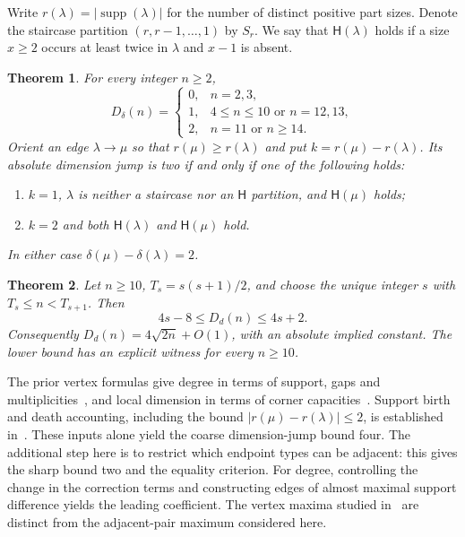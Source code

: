 \documentclass[11pt]{article}
\newtheorem{theorem}{Theorem}
\newcommand{\supp}{\operatorname{supp}}
\newcommand{\HH}{\mathsf{H}}
\begin{document}
Write $r(\lambda)=|\supp(\lambda)|$ for the number of distinct positive
part sizes. Denote the staircase partition $(r,r-1,\ldots,1)$ by $S_r$.
We say that $\HH(\lambda)$ holds if a size $x\geq2$ occurs at least twice
in $\lambda$ and $x-1$ is absent.

\begin{theorem}\label{thm:dimension}
For every integer $n\geq2$,
\begin{equation}\label{eq:exact-dimension}
 D_\delta(n)=
 \begin{cases}
 0,& n=2,3,\\
 1,& 4\leq n\leq10\text{ or }n=12,13,\\
 2,& n=11\text{ or }n\geq14.
 \end{cases}
\end{equation}
Orient an edge $\lambda\to\mu$ so that $r(\mu)\geq r(\lambda)$ and put
$k=r(\mu)-r(\lambda)$. Its absolute dimension jump is two if and only if
one of the following holds:
\begin{enumerate}
\item $k=1$, $\lambda$ is neither a staircase nor an $\HH$ partition,
      and $\HH(\mu)$ holds;
\item $k=2$ and both $\HH(\lambda)$ and $\HH(\mu)$ hold.
\end{enumerate}
In either case $\delta(\mu)-\delta(\lambda)=2$.
\end{theorem}

\begin{theorem}\label{thm:degree}
Let $n\geq10$, $T_s=s(s+1)/2$, and choose the unique integer $s$ with
$T_s\leq n<T_{s+1}$. Then
\begin{equation}\label{eq:degree-bounds}
 4s-8\leq D_d(n)\leq4s+2.
\end{equation}
Consequently $D_d(n)=4\sqrt{2n}+O(1)$, with an absolute implied constant.
The lower bound has an explicit witness for every $n\geq10$.
\end{theorem}

The prior vertex formulas give degree in terms of support, gaps and
multiplicities~\cite[Theorem~2.2]{LyudogovskiyDegree}, and local dimension
in terms of corner capacities~\cite[Theorem~7.1]{LyudogovskiyMorphology}.
Support birth and death accounting, including the bound
$|r(\mu)-r(\lambda)|\leq2$, is established
in~\cite[Theorem~3.4 and Corollary~3.5]{LyudogovskiySupport}.
These inputs alone yield the coarse dimension-jump bound four.
The additional step here is to restrict which endpoint types can be
adjacent: this gives the sharp bound two and the equality criterion.
For degree, controlling the change in the correction terms and constructing
edges of almost maximal support difference yields the leading coefficient.
The vertex maxima studied in~\cite{LyudogovskiyDegree} are distinct from
the adjacent-pair maximum considered here.
\end{document}
